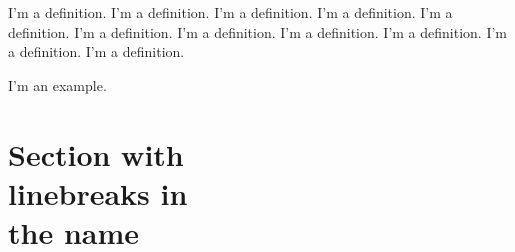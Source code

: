 \begin{definition}
I'm a definition. I'm a definition. I'm a definition. I'm a definition. I'm a definition. I'm a definition. I'm a definition. I'm a definition. I'm a definition. I'm a definition. I'm a definition. 
\end{definition}

\begin{example}
I'm an example.
\end{example}


\section[Optional table of contents heading]{Section with\\ linebreaks in\\the
name}


\Blindtext[2]




